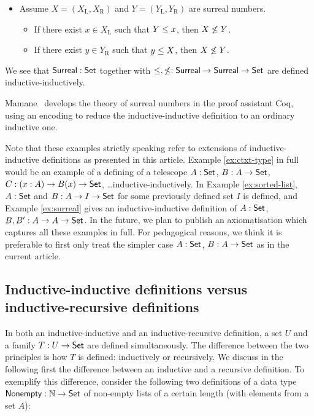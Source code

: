 \documentclass{article}
\begin{document}
\begin{example}
\begin{itemize}
\item Assume $X = (X_\mathrm{L}, X_\mathrm{R})$ and $Y = (Y_\mathrm{L}, Y_\mathrm{R})$ are surreal numbers.
 \begin{itemize}
 \item If there exist $x \in X_\mathrm{L}$ such that $Y \leq x$, then $X \not\leq Y$.
 \item If there exist $y \in Y_\mathrm{R}$ such that $y \leq X$, then $X \not\leq Y$.
 \end{itemize}
\end{itemize}
We see that $\mathsf{Surreal} : \mathsf{Set}$ together with ${ \leq, \not\leq : \mathsf{Surreal}
  \to \mathsf{Surreal} \to \mathsf{Set}}$ are defined inductive-inductively.


Mamane~\cite{mamane2004surrealCoq} develops the theory of surreal
numbers in the proof assistant Coq, using an encoding to reduce the
inductive-inductive definition to an ordinary inductive one.
\blackqed
\end{example}

Note that these examples strictly speaking refer to extensions of
inductive-inductive definitions as presented in this article. Example
\ref{ex:ctxt-type} in full would be an example of a defining of a
telescope $A : \mathsf{Set}$, $B : A \to \mathsf{Set}$, $C : (x : A) \to B(x) \to
\mathsf{Set}$, \ldots inductive-inductively. In Example \ref{ex:sorted-list},
$A : \mathsf{Set}$ and $B : A \to I \to \mathsf{Set}$ for some previously defined set
$I$ is defined, and Example \ref{ex:surreal} gives an
inductive-inductive definition of $A : \mathsf{Set}$, $B, B' : A \to A \to
\mathsf{Set}$. In the future, we plan to publish an axiomatisation which
captures all these examples in full. For pedagogical reasons, we think
it is preferable to first only treat the simpler case $A : \mathsf{Set}$, $B :
A \to \mathsf{Set}$ as in the current article.

\subsection{Inductive-inductive definitions versus inductive-recursive definitions}
\label{sec:indind-vs-IR}


In both an inductive-inductive and an inductive-recursive definition,
a set $U$ and a family $T : U \to \mathsf{Set}$ are defined
simultaneously. The difference between the two principles is how $T$
is defined: inductively or recursively. We discuss in the following
first the difference between an inductive and a recursive definition.
To exemplify this difference, consider the following two definitions
of a data type $\mathsf{Nonempty} : \mathbb{N} \to \mathsf{Set}$ of non-empty lists of a
certain length (with elements from a set $A$):
\end{document}
